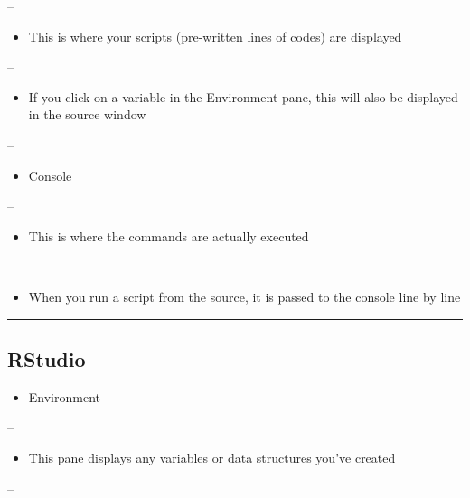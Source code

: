 \documentclass[]{article}
\providecommand{\tightlist}{%
  \setlength{\itemsep}{0pt}\setlength{\parskip}{0pt}}
\begin{document}
--

\begin{itemize}
\tightlist
\item
  This is where your scripts (pre-written lines of codes) are displayed
\end{itemize}

--

\begin{itemize}
\tightlist
\item
  If you click on a variable in the Environment pane, this will also be
  displayed in the source window
\end{itemize}

--

\begin{itemize}
\tightlist
\item
  Console
\end{itemize}

--

\begin{itemize}
\tightlist
\item
  This is where the commands are actually executed
\end{itemize}

--

\begin{itemize}
\tightlist
\item
  When you run a script from the source, it is passed to the console
  line by line
\end{itemize}

\begin{center}\rule{0.5\linewidth}{\linethickness}\end{center}

\hypertarget{rstudio-2}{%
\subsection{RStudio}\label{rstudio-2}}

\begin{itemize}
\tightlist
\item
  Environment
\end{itemize}

--

\begin{itemize}
\tightlist
\item
  This pane displays any variables or data structures you've created
\end{itemize}

--
\end{document}
